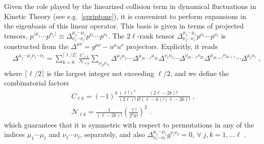 \documentclass[aps,prd,preprint,nofootinbib,amsmath,amssymb,showpacs,longbibliography,singlecolumn,superscriptaddress,10pt]{revtex4-1}
\theoremstyle{plain}
\theoremstyle{definition}
\begin{document}
Given the role played by the linearized collision term in dynamical fluctuations in Kinetic Theory (see e.g.~\eqref{sprintone}), it is convenient to perform expansions in the eigenbasis of this linear operator. This basis is given in terms of projected tensors, $p^{\langle \mu_{1}} \cdots p^{\mu_{\ell} \rangle} \equiv \Delta^{\mu_{1} \cdots \mu_{\ell}}_{\nu_{1} \cdots \nu_{\ell}} p^{\nu_{1}} \cdots p^{\nu_{\ell}}$. The $2 \ell$-rank tensor $\Delta^{\mu_{1} \cdots \mu_{\ell}}_{\nu_{1} \cdots \nu_{\ell}} p^{\nu_{1}} \cdots p^{\nu_{\ell}}$ is constructed from the $\Delta^{\mu \nu} = g^{\mu \nu} - u^{\mu} u^{\nu}$ projectors. Explicitly, it reads
\cite{DeGroot:1980dk}
%
\begin{equation}
\label{eq:def-deltao-1}
\begin{aligned}
&   \Delta^{\mu_{1} \cdots \mu_{\ell} \nu_{1} \cdots \nu_{\ell}} = \sum_{k = 0}^{\lceil \ell / 2 \rceil} \frac{C_{\ell k}}{\mathcal{N}_{\ell k}}\sum_{\wp_{\mu} \wp_{\nu}} \Delta^{\mu_{1} \mu_{2}} \cdots \Delta^{\mu_{2k-1} \mu_{2k}} \Delta^{\nu_{1} \nu_{2}} \cdots \Delta^{\nu_{2k-1} \nu_{2k}} \Delta^{\mu_{2k+1} \nu_{2k+1}} \cdots \Delta^{\mu_{\ell} \nu_{\ell}}\;, 
\end{aligned}    
\end{equation}
%
where $\lceil \ell / 2 \rceil$ is the largest integer not exceeding $\ell / 2$, and we define the combinatorial factors
%
\begin{subequations}
\label{eq:def-deltao-2}
\begin{align}
 &
 C_{\ell k} = (-1)^{k} \frac{(\ell!)^{2}}{(2 \ell)!} \frac{(2 \ell - 2k)!}{k!(\ell-k)!(\ell-2k)!}\;,
\\
&
\mathcal{N}_{\ell k} = \frac{1}{(\ell - 2k)!} \left( \frac{\ell!}{2^{k}k!} \right)^{2} \;.
\end{align}    
\end{subequations}
%
which guarantees that it is symmetric with respect to permutations in any of the indices $\mu_{1} \cdots \mu_{\ell}$ and $\nu_{1} \cdots \nu_{\ell}$, separately, and also $\Delta^{\mu_{1} \cdots \mu_{\ell}}_{\nu_{1} \cdots \nu_{\ell}} g^{\nu_{j} \nu_{k}} = 0$, $\forall \; j,k =1, \ldots \ell$ \cite{DeGroot:1980dk,Denicol:2021,Rocha:2023ilf}. 
\end{document}
